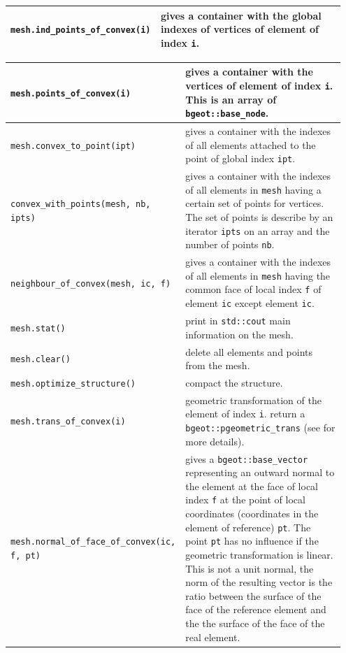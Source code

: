 \documentclass[11pt,a4paper]{article}
\begin{document}
\begin{center}
\begin{tabular}{|m{0.4\linewidth}|m{0.55\linewidth}|}
  {\tt mesh.ind\_points\_of\_convex(i)} & gives a container with the global indexes of  vertices of element of index {\tt i}.\\ \hline

\end{tabular}
\begin{tabular}{|m{0.4\linewidth}|m{0.55\linewidth}|}\hline

  {\tt mesh.points\_of\_convex(i)} & gives a container with the  vertices of element of index {\tt i}. This is an array of {\tt bgeot::base\_node}.\\ \hline

  {\tt mesh.convex\_to\_point(ipt)} & gives a container with the indexes of all elements attached to the point of global index {\tt ipt}.\\ \hline

  {\tt convex\_with\_points(mesh, nb, ipts) } & gives a container with the indexes of all elements in {\tt mesh} having a certain set of points for vertices. The set of points is describe by an iterator {\tt ipts} on an array and the number of points {\tt nb}.\\ \hline

  {\tt neighbour\_of\_convex(mesh, ic, f)} & gives a container with the indexes of all elements in {\tt mesh} having the common face of local index {\tt f} of element {\tt ic} except element {\tt ic}. \\ \hline

  {\tt mesh.stat()} & print in {\tt std::cout} main information on the mesh. \\ \hline

  {\tt mesh.clear()} & delete all elements and points from the mesh. \\ \hline

  {\tt mesh.optimize\_structure()} & compact the structure. \\ \hline

  {\tt mesh.trans\_of\_convex(i)} & geometric transformation of the element of index {\tt i}. return a {\tt bgeot::pgeometric\_trans} (see \cite{BASCOMP} for more details).  \\ \hline

  {\tt mesh.normal\_of\_face\_of\_convex(ic, f, pt)} & gives a {\tt bgeot::base\_vector} representing an outward normal to the element at the face of local index {\tt f} at the point of local coordinates (coordinates in the element of reference) {\tt pt}. The point {\tt pt} has no influence if the geometric transformation is linear. This is not a unit normal, the norm of the resulting vector is the ratio between the surface of the face of the reference element and the the surface of the face of the real element. \\ \hline

\end{tabular} \end{center}
\end{document}
